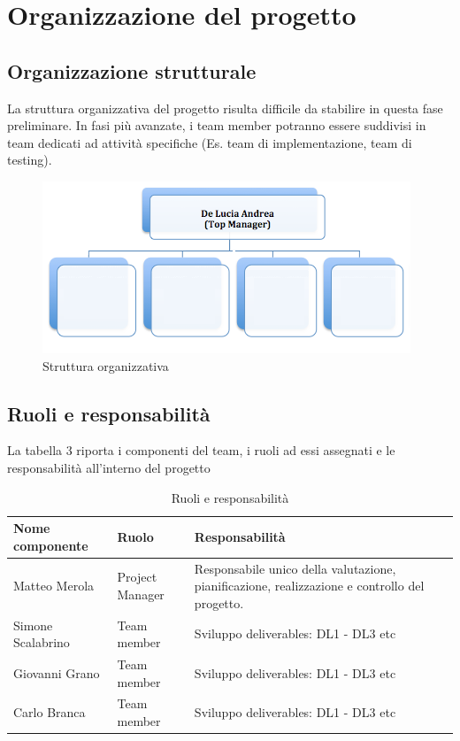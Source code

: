 \chapter{Organizzazione del progetto}	
		
		\section{Organizzazione strutturale}
		\label{sec:struc}
		
		La struttura organizzativa del progetto risulta difficile da stabilire in questa fase preliminare. In fasi più avanzate, i team member potranno essere suddivisi in team dedicati ad attività specifiche (Es. team di implementazione, team di testing).
		
		\begin{figure}
		\centering
		\includegraphics{img/organizzazione.png}
		\caption{Struttura organizzativa}\label{fig:1}
		\end{figure}
		
		
		\section{Ruoli e responsabilità}
		La tabella 3 riporta i componenti del team, i ruoli ad essi assegnati e le responsabilità all'interno del progetto
		
		\begin{table}[H]
			\begin{longtable}{|p{4cm}|p{4cm}|p{7cm}|}
				\hline
				Nome componente & Ruolo & Responsabilità\\
				\hline
				Matteo Merola & Project Manager & Responsabile unico della valutazione, pianificazione, realizzazione e controllo del progetto.\\[50pt]
				\hline
				Simone Scalabrino & Team member & Sviluppo deliverables: DL1 - DL3 etc\\[50pt]
				\hline
				Giovanni Grano & Team member & Sviluppo deliverables: DL1 - DL3 etc\\[50pt]
				\hline
				Carlo Branca & Team member & Sviluppo deliverables: DL1 - DL3 etc \\[50pt]
				\hline
			\end{longtable}
		\caption{Ruoli e responsabilità}\label{tab:3}
		\end {table}
		